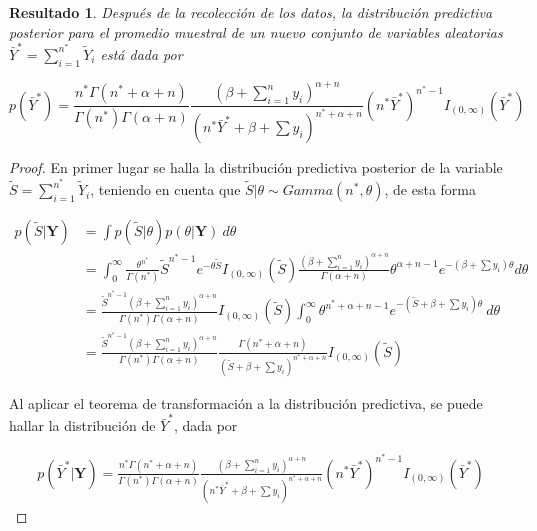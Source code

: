 \documentclass[
  10pt,
  spanish,
]{book}
\newtheorem{proposition}{Resultado}[chapter]
\theoremstyle{definition}
\theoremstyle{definition}
\theoremstyle{definition}
\theoremstyle{definition}
\theoremstyle{remark}
\begin{document}
\begin{proposition}
\protect\hypertarget{prp:unnamed-chunk-58}{}{\label{prp:unnamed-chunk-58} }Después de la recolección de los datos, la distribución predictiva posterior para el promedio muestral de un nuevo conjunto de variables aleatorias \(\bar{Y}^*=\sum_{i=1}^{n^*}\tilde{Y}_i\) está dada por

\begin{equation*}
p(\bar{Y}^*)=\frac{n^*\Gamma(n^*+\alpha+n)}{\Gamma(n^*)\Gamma(\alpha+n)}\frac{(\beta+\sum_{i=1}^ny_i)^{\alpha+n}}{(n^*\bar{Y}^*+\beta+\sum y_i)^{n^*+\alpha+n}}(n^*\bar{Y}^*)^{n^*-1}I_{(0,\infty)}(\bar{Y}^*)
\end{equation*}
\end{proposition}

\begin{proof}
\iffalse{} {Prueba. } \fi{}En primer lugar se halla la distribución predictiva posterior de la variable \(\tilde{S}=\sum_{i=1}^{n^*}\tilde{Y}_i\), teniendo en cuenta que \(\tilde{S}|\theta\sim Gamma(n^*,\theta)\), de esta forma

\begin{align*}
p(\tilde{S}|\mathbf{Y})&=\int p(\tilde{S}|\theta)p(\theta|\mathbf{Y})\ d\theta\\
&=\int_0^{\infty} \frac{\theta^{n^*}}{\Gamma(n^*)}\tilde{S}^{n^*-1}e^{-\theta\tilde{S}}I_{(0,\infty)}(\tilde{S})\frac{(\beta+\sum_{i=1}^ny_i)^{\alpha+n}}{\Gamma(\alpha+n)}\theta^{{\alpha+n-1}}e^{-(\beta+\sum y_i)\theta}d\theta\\
&=\frac{\tilde{S}^{n^*-1}(\beta+\sum_{i=1}^ny_i)^{\alpha+n}}{\Gamma(n^*)\Gamma(\alpha+n)}I_{(0,\infty)}(\tilde{S})\int_0^{\infty} \theta^{n^*+\alpha+n-1}e^{-(\tilde{S}+\beta+\sum y_i)\theta}\ d\theta\\
&=\frac{\tilde{S}^{n^*-1}(\beta+\sum_{i=1}^ny_i)^{\alpha+n}}{\Gamma(n^*)\Gamma(\alpha+n)}\frac{\Gamma(n^*+\alpha+n)}{(\tilde{S}+\beta+\sum y_i)^{n^*+\alpha+n}}I_{(0,\infty)}(\tilde{S})
\end{align*}

Al aplicar el teorema de transformación a la distribución predictiva, se puede hallar la distribución de \(\bar{Y}^*\), dada por

\begin{align*}
p(\bar{Y}^*|\mathbf{Y})=\frac{n^*\Gamma(n^*+\alpha+n)}{\Gamma(n^*)\Gamma(\alpha+n)}\frac{(\beta+\sum_{i=1}^ny_i)^{\alpha+n}}{(n^*\bar{Y}^*+\beta+\sum y_i)^{n^*+\alpha+n}}(n^*\bar{Y}^*)^{n^*-1}I_{(0,\infty)}(\bar{Y}^*)
\end{align*}
\end{proof}
\end{document}

